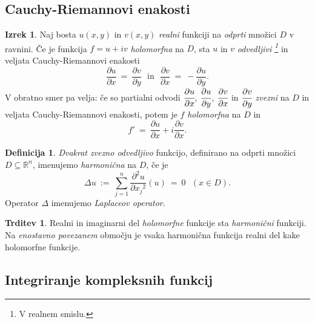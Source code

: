 \documentclass[11pt]{article}
\theoremstyle{definition}
\newtheorem{definicija}{Definicija}[section]
\theoremstyle{definition}
\newtheorem{trditev}{Trditev}[section]
\theoremstyle{definition}
\newtheorem{izrek}{Izrek}[section]
\begin{document}
\subsection{Cauchy-Riemannovi enakosti}
\vspace{0.5cm}

\begin{izrek}

Naj bosta $u(x, y)$ in $v(x, y)$ \textit{realni} funkciji na \textit{odprti} množici $D$ v ravnini. Če je funkcija $f = u + iv$ \textit{holomorfna} na $D$, sta $u$ in $v$ \textit{odvedljivi \footnote{V realnem smislu.}} in veljata Cauchy-Riemannovi enakosti
$$\frac{\partial u}{\partial x} ~=~ \frac{\partial v}{\partial y} ~~~\text{in}~~~ \frac{\partial v}{\partial x} ~=~ -\frac{\partial u}{\partial y}.$$ V obratno smer pa velja: če so partialni odvodi $\cfrac{\partial u}{\partial x}$, $\cfrac{\partial u}{\partial y}$, $\cfrac{\partial v}{\partial x}$ in $\cfrac{\partial v}{\partial y}$ \textit{zvezni} na $D$ in veljata Cauchy-Riemannovi enakosti, potem je $f$ \textit{holomorfna} na $D$ in
$$f' ~=~ \frac{\partial u}{\partial x} + i \frac{\partial v}{\partial x}.$$

\end{izrek}
\vspace{0.5cm}

\begin{definicija}

\textit{Dvakrat zvezno odvedljivo} funkcijo, definirano na odprti množici $D \subseteq \mathbb{R}^n$, imenujemo \textit{harmonična} na $D$, če je 
$$\Delta u ~:=~ \sum_{j=1}^n \frac{\partial^2 u}{\partial {x_j}^2}(u) ~=~ 0 ~~~(x \in D).$$
Operator $\Delta$ imenujemo \textit{Laplaceov operator}.

\end{definicija}
\vspace{0.5cm}

\begin{trditev}

Realni in imaginarni del \textit{holomorfne} funkcije sta \textit{harmonični} funkciji. Na \textit{enostavno povezanem} območju je vsaka harmonična funkcija realni del kake holomorfne funkcije.

\end{trditev}
\vspace{0.5cm}


\subsection{Integriranje kompleksnih funkcij}
\vspace{0.5cm}
\end{document}
